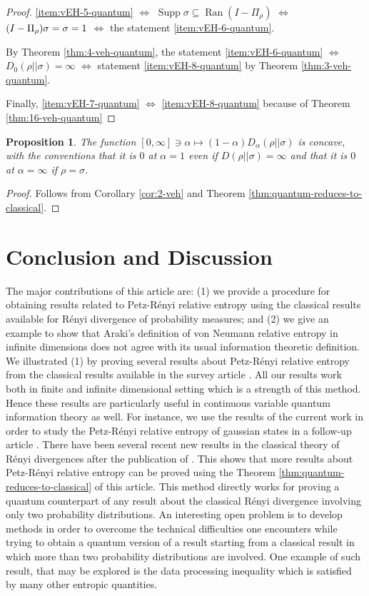 \documentclass[12pt,a4paper,oneside]{article}
\numberwithin{equation}{section}
\theoremstyle{definition}  %
\theoremstyle{plain}  %
\newtheorem{prop}[defn]{Proposition}
\theoremstyle{remark} %
\let\tr\relax
\DeclareMathOperator{\tr}{Tr}
\DeclareMathOperator{\ran}{Ran}
\DeclareMathOperator{\supp}{Supp}
\begin{document}
\begin{proof}
\ref{item:vEH-5-quantum}  $\Leftrightarrow$ $\supp \sigma \subseteq \ran (I-\Pi_{\rho})$ $\Leftrightarrow$ $\tr (I-\Pi_{\rho})\sigma = \tr \sigma =1$ $\Leftrightarrow$ the statement  \ref{item:vEH-6-quantum}.

By Theorem \ref{thm:4-veh-quantum}, the statement \ref{item:vEH-6-quantum} $\Leftrightarrow$ $D_0(\rho||\sigma) = \infty$  $\Leftrightarrow$ statement \ref{item:vEH-8-quantum} by Theorem \ref{thm:3-veh-quantum}.

Finally, \ref{item:vEH-7-quantum} $\Leftrightarrow$ \ref{item:vEH-8-quantum} because of Theorem \ref{thm:16-veh-quantum}


\end{proof}
\begin{prop}\label{cor:2-veh-quantum}
The function $[0, \infty] \ni \alpha \mapsto (1-\alpha)D_{\alpha}(\rho||\sigma)$ is concave, with the conventions that it is $0$ at $\alpha = 1$ even if $D(\rho||\sigma) = \infty$ and that it is $0$ at $\alpha = \infty$ if $\rho=\sigma$.

\end{prop}
\begin{proof}
Follows from Corollary \ref{cor:2-veh} and Theorem \ref{thm:quantum-reduces-to-classical}.
\end{proof}
\section{Conclusion and Discussion}
The major contributions of this article are: (1) we provide a procedure for obtaining results related to Petz-R\'enyi relative entropy using the classical results available for R\'enyi divergence of probability measures; and (2) we give an example to show  that Araki's definition of von Neumann relative entropy in infinite dimensions does not agree with its usual information theoretic definition.
We illustrated (1)  by proving several results about Petz-R\'enyi relative entropy from the classical results available in the survey article \cite{Erven-Harremos-2014}. All our results work both in finite and infinite dimensional setting which is a strength of this method. Hence these results are particularly useful in continuous variable quantum information theory as well. For instance, we use the results of the current work in order to study the Petz-R\'enyi relative entropy of gaussian states in a follow-up article \cite{androulakis-john-2022}.  There have been several recent new results in the classical theory of R\'enyi divergences after the publication of \cite{Erven-Harremos-2014}. This shows that more results about Petz-R\'enyi relative entropy can be proved using the Theorem \ref{thm:quantum-reduces-to-classical} of this article. This method directly works for proving a quantum counterpart of any result about the classical R\'enyi divergence involving only two probability distributions. An interesting open problem is to develop methods in order to overcome the technical difficulties one encounters while trying to obtain a quantum version of a result  starting from a classical result in which more than two probability distributions are involved. One example of such  result, that may be explored is the data processing inequality which is satisfied by many other entropic quantities.
\end{document}
